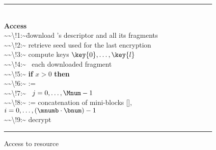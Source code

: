 \begin{figure}[!t]
\begin{small}
\hrule          %
\begin{tabbing}
\hfill\\
{\bf Access}\\[1em]
\num{~~\!1:~}\= download \resource's descriptor and all its fragments \\[0.3em]
\num{~~\!2:~}\1 retrieve seed  used for the last encryption \\[0.3em]
\num{~~\!3:~}\1 compute keys $\key{0},\ldots,\key{l}$\\[0.3em]
\num{~~\!4:~}\1 \myfor\  each downloaded fragment   \\[0.3em]
\num{~~\!5:~}\2     {\bf if} $x>0$ {\bf then} \\[0.3em]
\num{~~\!6:~}\2      :=  \\[0.3em]
\num{~~\!7:~}\1 \myfor\ $j=0,\ldots,\Mnum-1$  \\[0.3em]
\num{~~\!8:~}\2      := concatenation of mini-blocks [], $i=0,\ldots, (\mnumb \cdot \bnum)-1$\\[0.3em]
\num{~~\!9:~}\2     decrypt 
\end{tabbing}
\hrule
\vspace{.5em}
\end{small}
\caption{\label{ms:fig:access}Access to resource \resource}
\end{figure}

